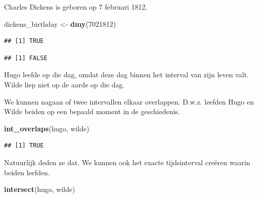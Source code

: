 \documentclass[]{tufte-book}
\newenvironment{Shaded}{}{}
\newcommand{\DecValTok}[1]{\textcolor[rgb]{0.25,0.63,0.44}{#1}}
\newcommand{\KeywordTok}[1]{\textcolor[rgb]{0.00,0.44,0.13}{\textbf{#1}}}
\newcommand{\NormalTok}[1]{#1}
\newcommand{\OperatorTok}[1]{\textcolor[rgb]{0.40,0.40,0.40}{#1}}
\newcommand{\StringTok}[1]{\textcolor[rgb]{0.25,0.44,0.63}{#1}}
\begin{document}
Charles Dickens is geboren op 7 februari 1812.

\begin{Shaded}
\begin{Highlighting}[]
\NormalTok{dickens_birthday <-}\StringTok{ }\KeywordTok{dmy}\NormalTok{(}\DecValTok{7021812}\NormalTok{)}
\end{Highlighting}
\end{Shaded}

\begin{Shaded}
\end{Shaded}

\begin{verbatim}
## [1] TRUE
\end{verbatim}

\begin{Shaded}
\end{Shaded}

\begin{verbatim}
## [1] FALSE
\end{verbatim}

Hugo leefde op die dag, omdat deze dag binnen het interval van zijn leven valt. Wilde liep niet op de aarde op die dag.

We kunnen nagaan of twee intervallen elkaar overlappen. D.w.z. leefden Hugo en Wilde beiden op een bepaald moment in de geschiedenis.

\begin{Shaded}
\begin{Highlighting}[]
\KeywordTok{int_overlaps}\NormalTok{(hugo, wilde)}
\end{Highlighting}
\end{Shaded}

\begin{verbatim}
## [1] TRUE
\end{verbatim}

Natuurlijk deden ze dat. We kunnen ook het exacte tijdsinterval creëren waarin beiden leefden.

\begin{Shaded}
\begin{Highlighting}[]
\KeywordTok{intersect}\NormalTok{(hugo, wilde)}
\end{Highlighting}
\end{Shaded}
\end{document}
